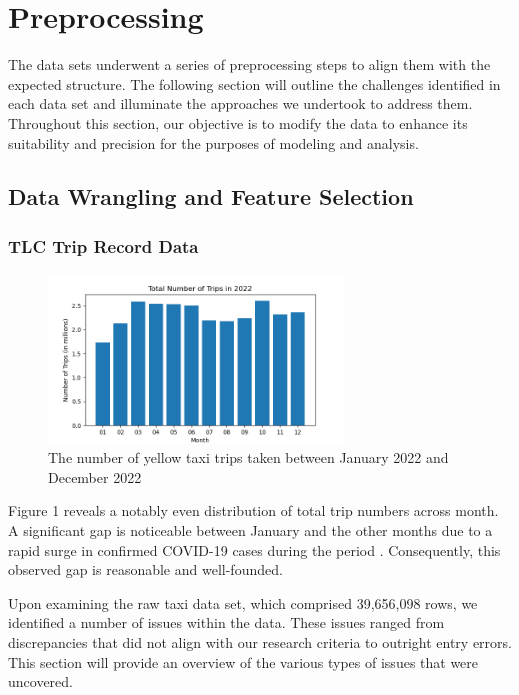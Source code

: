\documentclass[11pt]{article}
\begin{document}
\section{Preprocessing}
The data sets underwent a series of preprocessing steps to align them with the expected structure. The following section will outline the challenges identified in each data set and illuminate the approaches we undertook to address them. Throughout this section, our objective is to modify the data to enhance its suitability and precision for the purposes of modeling and analysis.

\subsection{Data Wrangling and Feature Selection}
\subsubsection{TLC Trip Record Data}
\begin{figure}[h]
    \includegraphics[width=0.7\textwidth]{plots/Number_of_Trips_WRT_Month_bar.png}
    \centering
    \caption{The number of yellow taxi trips taken between January 2022 and December 2022}
\end{figure}
Figure 1 reveals a notably even distribution of total trip numbers across month. A significant gap is noticeable between January and the other months due to a rapid surge in confirmed COVID-19 cases during the period \cite{covid}. Consequently, this observed gap is reasonable and well-founded.

Upon examining the raw taxi data set, which comprised 39,656,098 rows, we identified a number of issues within the data. These issues ranged from discrepancies that did not align with our research criteria to outright entry errors. This section will provide an overview of the various types of issues that were uncovered.
\end{document}
